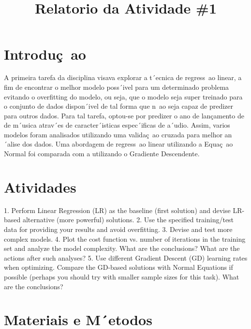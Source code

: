 \documentclass[conference]{IEEEtran}
\begin{document}
\title{Relatorio da Atividade \#1}

\author{
\and
{}
}

\maketitle

\section{Introduç~ao}

A primeira tarefa da disciplina visava explorar a t´ecnica de regress~ao linear, a fim de encontrar o melhor modelo poss´ivel para um determinado problema evitando o overfitting do modelo, ou seja, que o modelo seja super treinado para o conjunto de dados dispon´ivel de tal forma que n~ao seja capaz de predizer para outros dados. Para tal tarefa, optou-se por predizer o ano de lançamento de de m´usica atrav´es de caracter´isticas espec´ificas de a´udio. Assim, varios modelos foram analisados utilizando uma validaç~ao cruzada para melhor an´alise dos dados. Uma abordagem de regress~ao linear utilizando a Equaç~ao Normal foi comparada com a utilizando o Gradiente Descendente.

\section{Atividades}
 
1. Perform Linear Regression (LR) as the baseline (first solution) and devise LR-based alternative (more
powerful) solutions.
2. Use the specified training/test data for providing your results and avoid overfitting.
3. Devise and test more complex models.
4. Plot the cost function vs. number of iterations in the training set and analyze the model complexity.
What are the conclusions? What are the actions after such analyses?
5. Use different Gradient Descent (GD) learning rates when optimizing. Compare the GD-based solutions
with Normal Equations if possible (perhaps you should try with smaller sample sizes for this task).
What are the conclusions?

\section{Materiais e M´etodos}
\end{document}
